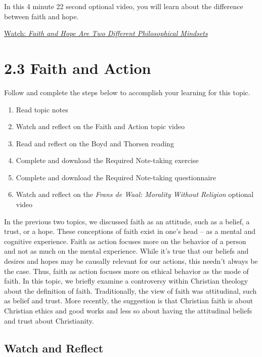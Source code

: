 \documentclass[
]{book}
\providecommand{\tightlist}{%
  \setlength{\itemsep}{0pt}\setlength{\parskip}{0pt}}
\begin{document}
\begin{reflect}
In this 4 minute 22 second optional video, you will learn about the difference between faith and hope.

\href{https://youtu.be/-b5Hiijc4bU?si=7WEWLT5UR6GsiZVj}{Watch: \emph{Faith and Hope Are Two Different Philosophical Mindsets}}
\end{reflect}

\hypertarget{faith-and-action}{%
\section*{2.3 Faith and Action}\label{faith-and-action}}

Follow and complete the steps below to accomplish your learning for this topic.

\begin{enumerate}
\def\labelenumi{\arabic{enumi}.}
\tightlist
\item
  Read topic notes
\item
  Watch and reflect on the Faith and Action topic video
\item
  Read and reflect on the Boyd and Thorsen reading
\item
  Complete and download the Required Note-taking exercise
\item
  Complete and download the Required Note-taking questionnaire
\item
  Watch and reflect on the \emph{Frans de Waal: Morality Without Religion} optional video
\end{enumerate}

In the previous two topics, we discussed faith as an attitude, such as a belief, a trust, or a hope. These conceptions of faith exist in one's head -- as a mental and cognitive experience. Faith as action focuses more on the behavior of a person and not as much on the mental experience. While it's true that our beliefs and desires and hopes may be causally relevant for our actions, this needn't always be the case. Thus, faith as action focuses more on ethical behavior as the mode of faith. In this topic, we briefly examine a controversy within Christian theology about the definition of faith. Traditionally, the view of faith was attitudinal, such as belief and trust. More recently, the suggestion is that Christian faith is about Christian ethics and good works and less so about having the attitudinal beliefs and trust about Christianity.

\hypertarget{watch-and-reflect-13}{%
\subsection*{Watch and Reflect}\label{watch-and-reflect-13}}
\end{document}
